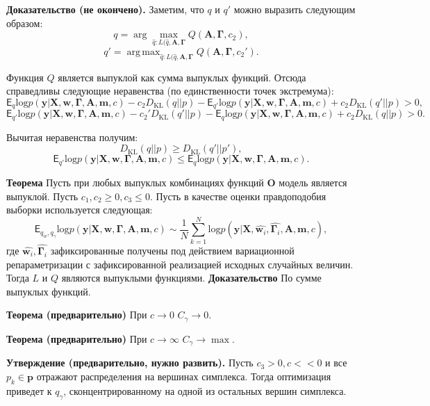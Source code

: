 \documentclass[12pt]{article}
\DeclareMathOperator*{\argmax}{arg\,max}
\begin{document}
\textbf{Доказательство (не окончено).}
Заметим, что $q$ и $q'$ можно выразить следующим образом:
\[
    q = \arg\max_{\hat{q}: L(\hat{q}, \mathbf{A}, \boldsymbol{\Gamma}} Q( \mathbf{A}, \boldsymbol{\Gamma}, c_2),
\]
\[
    q' = \argmax_{\hat{q}: L(\hat{q}, \mathbf{A}, \boldsymbol{\Gamma}} Q( \mathbf{A}, \boldsymbol{\Gamma}, c_2').
\]

Функция $Q$ является выпуклой как сумма выпуклых функций. Отсюда справедливы следующие неравенства (по единственности точек экстремума):
\[
    \mathsf{E}_{q}\text{log} p(\mathbf{y}|\mathbf{X},\mathbf{w}, \boldsymbol{\Gamma}, \mathbf{A},\mathbf{m}, c) - c_2  D_\text{KL}(q||p)  -  \mathsf{E}_{q'}\text{log} p(\mathbf{y}|\mathbf{X},\mathbf{w}, \boldsymbol{\Gamma}, \mathbf{A},\mathbf{m}, c) + c_2  D_\text{KL}(q'||p) > 0,
\]
\[
    \mathsf{E}_{q'}\text{log} p(\mathbf{y}|\mathbf{X},\mathbf{w}, \boldsymbol{\Gamma}, \mathbf{A},\mathbf{m}, c) - c_2'  D_\text{KL}(q'||p)  -  \mathsf{E}_{q}\text{log} p(\mathbf{y}|\mathbf{X},\mathbf{w}, \boldsymbol{\Gamma}, \mathbf{A},\mathbf{m}, c) + c_2  D_\text{KL}(q||p) > 0.
\]

Вычитая неравенства получим:
\[
    D_\text{KL}(q||p) \geq D_\text{KL}(q'||p'),
\]
\[
    \mathsf{E}_{q'}\text{log} p(\mathbf{y}|\mathbf{X},\mathbf{w}, \boldsymbol{\Gamma}, \mathbf{A},\mathbf{m}, c)  \leq \mathsf{E}_{q}\text{log} p(\mathbf{y}|\mathbf{X},\mathbf{w}, \boldsymbol{\Gamma}, \mathbf{A},\mathbf{m}, c) .
\]

\textbf{Теорема} Пусть при любых выпуклых комбинациях функций $\mathbf{O}$ модель является выпуклой. Пусть $c_1,c_2 \geq 0,  c_3 \leq 0$. Пусть в качестве оценки правдоподобия выборки используется следующая:
\[
    \mathsf{E}_{q_w,q_\gamma}\text{log} p(\mathbf{y}|\mathbf{X},\mathbf{w}, \boldsymbol{\Gamma}, \mathbf{A},\mathbf{m}, c) \sim \frac{1}{N}\sum_{k=1}^N \text{log} p(\mathbf{y}|\mathbf{X},\hat{\mathbf{w}_i}, \hat{\boldsymbol{\Gamma}_i}, \mathbf{A},\mathbf{m}, c),
\]  
где $\hat{\mathbf{w}_i}, \hat{\boldsymbol{\Gamma}_i}$ зафиксированные получены под действием вариационной репараметризации с зафиксированной реализацией исходных случайных величин. Тогда $L$ и $Q$ являются выпуклыми функциями.
\textbf{Доказательство} По сумме выпуклых функций.
 
\textbf{Теорема (предварительно)} При $c \to 0$ $C_\gamma \to 0$.

\textbf{Теорема (предварительно)} При $c \to \infty$ $C_\gamma \to \max$.

\textbf{Утверждение (предварительно, нужно развить).} Пусть $c_3 > 0, c << 0$ и все $p_k \in \mathbf{p}$ отражают распределения на вершинах симплекса. Тогда оптимизация приведет к $q_\gamma$, сконцентрированному на одной из остальных вершин симплекса.
\end{document}

